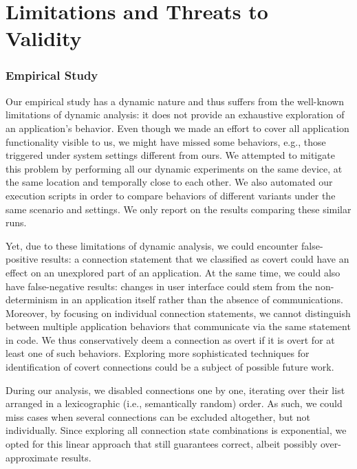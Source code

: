 \vspace{0.05in}
\vspace{-0.1in}
\section{Limitations and Threats to \\Validity}
\label{sec:limitations}

\subsubsection{Empirical Study}
Our empirical study has a dynamic nature and thus suffers from the well-known limitations of dynamic analysis: it does not provide an exhaustive exploration of an application's behavior.
Even though we made an effort to cover all application functionality visible to us, we might have missed some behaviors, e.g., those triggered under system settings different from ours. 
We attempted to mitigate this problem by performing all our dynamic experiments on the same device, at the same location and temporally close to each other.  
We also automated our execution scripts in order to compare behaviors of different variants under the same scenario and settings. 
We only report on the results comparing these similar runs.  

Yet, due to these limitations of dynamic analysis, we could encounter false-positive results: a connection statement that we classified as covert could have an effect on an unexplored part of an application. 
At the same time, we could also have false-negative results: changes in user interface could stem from the non-determinism in an application itself rather than the absence of communications. 
Moreover, by focusing on individual connection statements, we cannot distinguish between multiple application behaviors
that communicate via the same statement in code. We thus conservatively deem a connection as overt if it is overt for at least one of such behaviors. 
Exploring more sophisticated techniques for identification of covert connections could be a subject of possible future work.

During our analysis, we disabled connections one by one, iterating over their list arranged in a lexicographic (i.e., semantically random) order. As such, we could miss cases when 
several connections can be excluded altogether, but not individually. 
Since exploring all connection state combinations is exponential, we opted for this linear approach that still guarantees correct, 
albeit possibly over-approximate results. 

